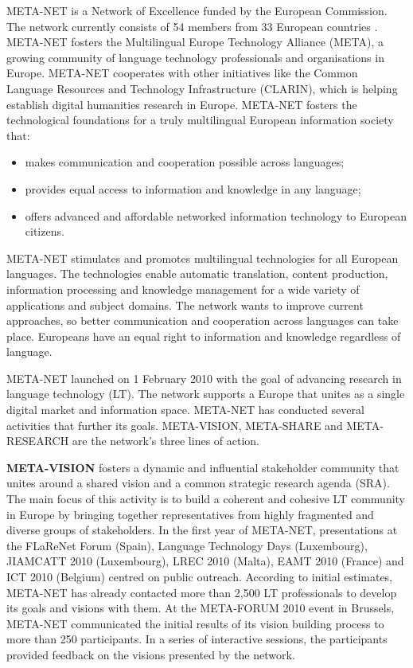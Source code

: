 \documentclass[]{../../metanetpaper}
\begin{document}
\begin{multicols}{2}
META-NET is a Network of Excellence funded by the European Commission. The network currently consists of 54 members from 33 European countries \cite{rehm2011}. META-NET fosters the Multilingual Europe Technology Alliance (META), a growing community of language technology professionals and organisations in Europe. META-NET cooperates with other initiatives like the Common Language Resources and Technology Infrastructure (CLARIN), which is helping establish digital humanities research in Europe. META-NET fosters the technological foundations for a truly multilingual European information society that:

\begin{itemize}
\item makes communication and cooperation possible across languages;
\item provides equal access to information and knowledge in any language;
\item offers advanced and affordable networked information technology to European citizens.
\end{itemize}

META-NET stimulates and promotes multilingual technologies for all European languages. The technologies enable automatic translation, content production, information processing and knowledge management for a wide variety of applications and subject domains. The network wants to improve current approaches, so better communication and cooperation across languages can take place. Europeans have an equal right to information and knowledge regardless of language.

META-NET launched on 1 February 2010 with the goal of advancing research in language technology (LT). The network supports a Europe that unites as a single digital market and information space. META-NET has conducted several activities that further its goals. META-VISION, META-SHARE and META-RESEARCH are the network’s three lines of action.

\textbf{META-VISION} fosters a dynamic and influential stakeholder community that unites around a shared vision and a common strategic research agenda (SRA). The main focus of this activity is to build a coherent and cohesive LT community in Europe by bringing together representatives from highly fragmented and diverse groups of stakeholders. In the first year of META-NET, presentations at the FLaReNet Forum (Spain), Language Technology Days (Luxembourg), JIAMCATT 2010 (Luxembourg), LREC 2010 (Malta), EAMT 2010 (France) and ICT 2010 (Belgium) centred on public outreach. According to initial estimates, META-NET has already contacted more than 2,500 LT professionals to develop its goals and visions with them. At the META-FORUM 2010 event in Brussels, META-NET communicated the initial results of its vision building process to more than 250 participants. In a series of interactive sessions, the participants provided feedback on the visions presented by the network. 


\end{multicols}
\end{document}
